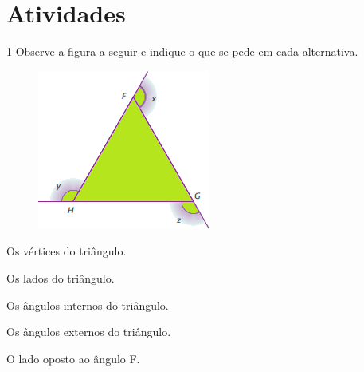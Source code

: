 \section*{Atividades}

\num{1} Observe a figura a seguir e indique o que se pede em cada alternativa.

\medskip

\begin{minipage}{.5\textwidth}
\begin{figure}[H]
\centering\includegraphics[width=\textwidth]{./imgSAEB_8_MAT/media/image13.png}
\end{figure}
\end{minipage}
\begin{minipage}{.5\textwidth}
\begin{escolha}[itemsep=0pt]
\item Os vértices do triângulo.\\

\item Os lados do triângulo.\\

\item Os ângulos internos do triângulo.\\

\item Os ângulos externos do triângulo.\\

\item O lado oposto ao ângulo F.\\

\end{escolha}
\end{minipage}

